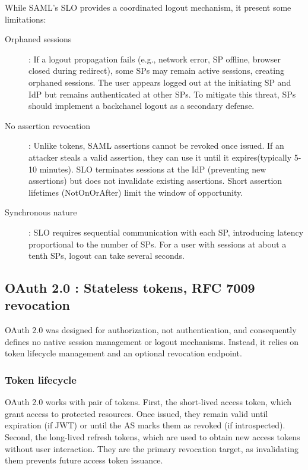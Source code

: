 \documentclass[../memoire.tex]{subfiles}
\begin{document}
While SAML's SLO provides a coordinated logout mechanism, it present some limitations:
\begin{description}
  \item[Orphaned sessions]: If a logout propagation fails (e.g., network error, SP offline, browser closed during redirect), some SPs may remain active sessions, creating orphaned sessions. The user appears logged out at the initiating SP and IdP but remains authenticated at other SPs.\cite[p.~229]{wilson2022} To mitigate this threat, SPs should implement a backchanel logout as a secondary defense.
  \item[No assertion revocation]: Unlike tokens, SAML assertions cannot be revoked once issued. If an attacker steals a valid assertion, they can use it until it expires(typically 5-10 minutes). SLO terminates sessions at the IdP (preventing new assertions) but does not invalidate existing assertions. Short assertion lifetimes (NotOnOrAfter) limit the window of opportunity\cite[p.~229]{wilson2022}.
  \item[Synchronous nature]: SLO requires sequential communication with each SP, introducing latency proportional to the number of SPs. For a user with sessions at about a tenth SPs, logout can take several seconds.
\end{description}

\subsection{OAuth 2.0 : Stateless tokens, RFC 7009 revocation}

OAuth 2.0 was designed for authorization, not authentication, and consequently defines no native session management  or logout mechanisms. Instead, it relies on token lifecycle management and an optional revocation endpoint.

\subsubsection*{Token lifecycle}

OAuth 2.0 works with pair of tokens. First, the short-lived access token, which grant access to protected resources. Once issued, they remain valid until expiration (if JWT) or until the AS marks them as revoked (if introspected). Second, the long-lived refresh tokens, which are used to obtain new access tokens without user interaction. They are the primary revocation target, as invalidating them prevents future access token issuance.
\end{document}
